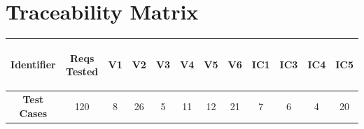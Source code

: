 \documentclass [10pt]{article}
\begin{document}
\section{Traceability Matrix}
\pagebreak
\begin{center}

\begin{tabularx} {.85\textwidth} {|c|c|c|c|c|c|c|c|c|c|c|c|} \hline
  \textbf{Identifier} & \begin{minipage} {.075\columnwidth} \vspace{1mm} \begin {center}\textbf{Reqs Tested}\vspace{1mm}\end{center}\end{minipage}
 & \textbf{V1} &\textbf{V2} &\textbf{V3} &\textbf{V4} &\textbf{V5} &\textbf{V6} &\textbf{IC1}  &\textbf{IC3} &\textbf{IC4}&\textbf{IC5}  \\ \hline
 
 
 \textbf{Test Cases}& 120 & 8  &26 &5 &11 &12 &21&7  &6 & 4 & 20 \\ \hline


\end{tabularx}
\end{center}
\end{document}
